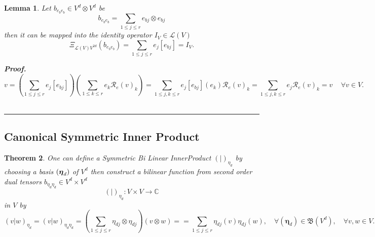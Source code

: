 \documentclass[aps,preprint]{revtex4}
\newtheorem{theorem}{Theorem}
\newtheorem{lemma}[theorem]{Lemma}
\newenvironment{proof}[1][Proof]{\noindent\textbf{#1.} }{\ \rule{0.5em}{0.5em}}
\begin{document}
\begin{lemma}
Let $b_{e_{b}e_{b}}\in V^{d}\otimes V^{d}$ be 
\begin{equation}
b_{e_{b}e_{b}}=\sum_{1\leq j\leq r}e_{bj}\otimes e_{bj}
\end{equation}%
then it can be mapped into the identity operator $I_{V}\in \mathcal{L}\left(
V\right) $ 
\begin{equation}
\Xi _{\mathcal{L}\left( V\right) V^{2d}}\left( b_{e_{b}e_{b}}\right)
=\sum_{1\leq j\leq r}e_{j}\left[ e_{bj}\right] =I_{V}.
\end{equation}

\begin{proof}
\begin{equation}
v=\left( \sum_{1\leq j\leq r}e_{j}\left[ e_{bj}\right] \right) \left(
\sum_{1\leq k\leq r}e_{k}\mathcal{R}_{e}\left( v\right) _{k}\right)
=\sum_{1\leq j,k\leq r}e_{j}\left[ e_{bj}\right] \left( e_{k}\right) 
\mathcal{R}_{e}\left( v\right) _{k}=\sum_{1\leq j,k\leq r}e_{j}\mathcal{R}%
_{e}\left( v\right) _{k}=v\,\quad \forall v\in V.
\end{equation}
\end{proof}
\end{lemma}

\label{Canonical Symmetric Inner Product}

\subsection{Canonical Symmetric Inner Product}

\begin{theorem}
One can define a \emph{Symmetric Bi Linear InnerProduct} $\left( \left.
{}\right\vert \right) _{\eta _{d}}$ by choosing a basis $\left( \boldsymbol{%
\eta }_{d}\right) $ of $V^{d}$ then construct a bilinear function from
second order dual tensors $b_{\eta _{d}\eta _{d}}\in V^{d}\times V^{d}$ 
\begin{equation}
\left( \left. {}\right\vert \right) _{\eta _{d}}:V\times V\rightarrow 
\mathbb{C}
\end{equation}%
in $V$ by 
\begin{equation}
\left( \left. v\right\vert w\right) _{\eta _{d}}=\left( \left. v\right\vert
w\right) _{\eta _{d}\eta _{d}}=\left( \sum_{1\leq j\leq r}\eta _{dj}\otimes
\eta _{dj}\right) \left( v\otimes w\right) ==\sum_{1\leq j\leq r}\eta
_{dj}\left( v\right) \eta _{dj}\left( w\right) ,\quad \forall \left( 
\boldsymbol{\eta }_{d}\right) \in \mathfrak{B}\left( V^{d}\right) ,\quad
\forall v,w\in V.
\end{equation}
\end{theorem}
\end{document}
